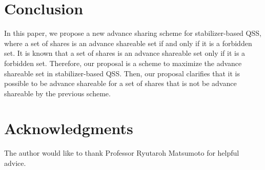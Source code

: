 \documentclass[11pt,a4paper]{article}
\theoremstyle{definition}
\begin{document}
\section{Conclusion}\label{sec:four}
In this paper,  we propose a new advance sharing scheme for stabilizer-based QSS, 
where a set of shares is an advance shareable set if and only if it is a forbidden set.
It is known that a set of shares is an advance shareable set only if it is a forbidden set. 
Therefore, our proposal is a scheme to maximize the advance shareable set in stabilizer-based QSS. 
Then, our proposal clarifies that it is possible to be advance shareable for a set of shares that is not be advance shareable by the previous scheme.

\section*{Acknowledgments}
The author would like to thank Professor Ryutaroh Matsumoto for helpful advice. 

\end{document}
